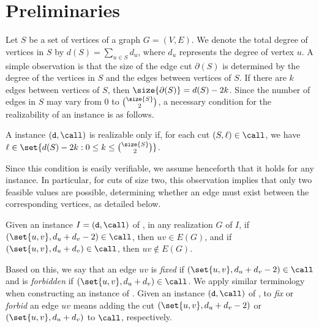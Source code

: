 \section{Preliminaries}
\label{sec:preliminaries}

Let $S$ be a set of vertices of a graph $G=(V, E)$.
We denote the total degree of vertices in $S$ by $d(S) = \sum_{u \in S} d_u$, where $d_u$ represents the degree of vertex $u$.
A simple observation is that the size of the edge cut $\partial(S)$ is determined by the degree of the vertices in $S$ and the edges between vertices of $S$.
If there are $k$ edges between vertices of $S$, then $\size{\partial(S)}=d(S)- 2k$.
%
Since the number of edges in $S$ may vary from $0$ to $\binom{\size{S}}{2}$, a necessary condition for the realizability of an \GRC{} instance is as follows.

\begin{remark}
\label{thm:feasible_cut_sizes}
    A \GRC{} instance $(\texttt{d}, \call)$ is realizable only if, for each cut $(S, \ell) \in \call$, we have $\ell \in \set{ d(S) - 2k : 0 \leq k \leq \binom{\size{S}}{2} }$.
\end{remark}

Since this condition is easily verifiable, we assume henceforth that it holds for any \GRC{} instance. In particular, for cuts of size two, this observation implies that only two feasible values are possible, determining whether an edge must exist between the corresponding vertices, as detailed below.

\begin{remark}
\label{thm:fixed_forbidden_edges}
    Given an instance $I = (\texttt{d}, \call)$ of \GRC{}, in any realization $G$ of $I$, if $(\set{u, v}, d_u + d_v - 2) \in \call$, then $uv \in E(G)$, and if $(\set{u, v}, d_u + d_v) \in \call$, then $uv \notin E(G)$.
\end{remark}

Based on this, we say that an edge $uv$ is \textit{fixed} if $(\set{u, v}, d_u + d_v - 2) \in \call$ and is \textit{forbidden} if $(\set{u, v}, d_u + d_v) \in \call$.
We apply similar terminology when constructing an instance of \GRC{}.
Given an instance $(\texttt{d}, \call)$ of \GRC{}, to \textit{fix} or \textit{forbid} an edge $uv$ means adding the cut $(\set{u, v}, d_u + d_v - 2)$ or $(\set{u, v}, d_u + d_v)$ to $\call$, respectively.

